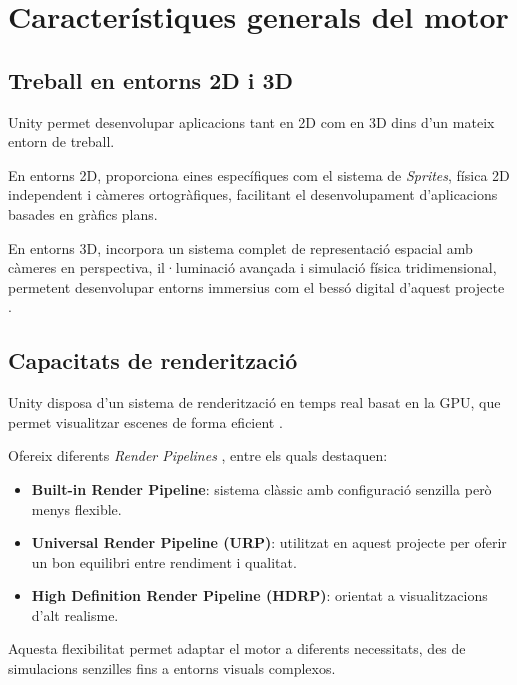 \documentclass[12pt,a4paper]{report}
\begin{document}
\section{Característiques generals del motor}

\subsection{Treball en entorns 2D i 3D}

Unity permet desenvolupar aplicacions tant en 2D com en 3D dins d'un mateix entorn de treball.

En entorns 2D, proporciona eines específiques com el sistema de \textit{Sprites}, física 2D independent i càmeres ortogràfiques, facilitant el desenvolupament d'aplicacions basades en gràfics plans.

En entorns 3D, incorpora un sistema complet de representació espacial amb càmeres en perspectiva, il·luminació avançada i simulació física tridimensional, permetent desenvolupar entorns immersius com el bessó digital d'aquest projecte \cite{Unity2Dor3D}.

\subsection{Capacitats de renderització}

Unity disposa d'un sistema de renderització en temps real basat en la GPU, que permet visualitzar escenes de forma eficient \cite{GPUWikipedia}. 

Ofereix diferents \textit{Render Pipelines} \cite{UnityRenderPipelines}, entre els quals destaquen:
\begin{itemize}
    \item \textbf{Built-in Render Pipeline}: sistema clàssic amb configuració senzilla però menys flexible.
    \item \textbf{Universal Render Pipeline (URP)}: utilitzat en aquest projecte per oferir un bon equilibri entre rendiment i qualitat.
    \item \textbf{High Definition Render Pipeline (HDRP)}: orientat a visualitzacions d'alt realisme.
\end{itemize}

Aquesta flexibilitat permet adaptar el motor a diferents necessitats, des de simulacions senzilles fins a entorns visuals complexos.


%
\end{document}

